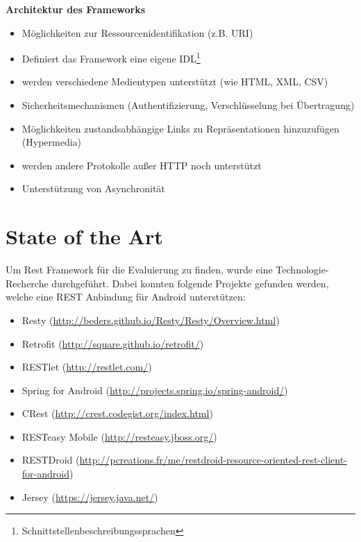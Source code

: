 \documentclass[a4paper,11pt,german,public]{INSOexpose}
\begin{document}
\textbf{Architektur des Frameworks}
\begin{itemize}[label=$-$]
	\item Möglichkeiten zur Ressourcenidentifikation (z.B. URI)
	\item Definiert das Framework eine eigene IDL\footnote{Schnittstellenbeschreibungssprachen}
	\item werden verschiedene Medientypen unterstützt (wie HTML, XML, CSV)
	\item Sicherheitsmechanismen  (Authentifizierung, Verschlüsselung bei Übertragung)
	\item Möglichkeiten zustandsabhängige Links zu Repräsentationen hinzuzufügen (Hypermedia)
	\item werden andere Protokolle außer HTTP noch unterstützt
	\item Unterstützung von Asynchronität
\end{itemize}

\section{State of the Art}
Um Rest Framework für die Evaluierung zu finden, wurde eine Technologie-Recherche durchgeführt. Dabei konnten folgende Projekte gefunden werden, welche eine REST Anbindung für Android unterstützen:
\begin{itemize}
	\item Resty (\url{http://beders.github.io/Resty/Resty/Overview.html})
	\item Retrofit (\url{http://square.github.io/retrofit/})
	\item RESTlet (\url{http://restlet.com/})
	\item Spring for Android (\url{http://projects.spring.io/spring-android/})
	\item CRest (\url{http://crest.codegist.org/index.html})
	\item RESTeasy Mobile (\url{http://resteasy.jboss.org/})
	\item RESTDroid (\url{http://pcreations.fr/me/restdroid-resource-oriented-rest-client-for-android})
	\item Jersey (\url{https://jersey.java.net/})
\end{itemize}
\end{document}
